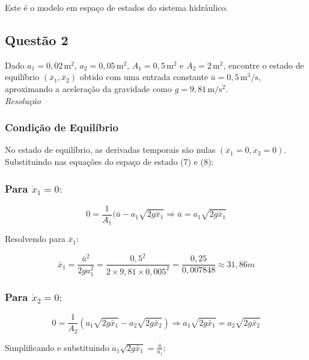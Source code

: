 \documentclass[12pt,a4]{article}
\begin{document}
Este é o modelo em espaço de estados  do sistema hidráulico.


    
\subsection{Questão 2}
    Dado $ a_1 = 0{,}02\,\text{m}^2 $, $a_2 = 0{,}05\,\text{m}^2 $, $ A_1 = 0{,}5\,\text{m}^2 $ e $ A_2 = 2\,\text{m}^2 $, encontre o estado de equilíbrio $ (\bar{x}_1, \bar{x}_2) $ obtido com uma entrada constante $ \bar{u} = 0{,}5\,\text{m}^3/\text{s} $, aproximando a aceleração da gravidade como $g = 9{,}81\,\text{m}/\text{s}^2 $.\\
    \textit{Resolução}
\subsubsection{Condição de Equilíbrio}
    No estado de equilíbrio, as derivadas temporais são nulas $(\dot{x}_1 = 0, \dot{x}_2 = 0)$. Substituindo nas equações do espaço de estado (7) e (8):

    \subsubsection{Para $\dot{x}_1 = 0:$}

     \begin{equation}
    0 = \frac{1}{A_1} (\bar{u} - a_1 \sqrt{2g \bar{x}_1} \Longrightarrow \bar{u} = a_1\sqrt{2g \bar{x}_1}
   \end{equation}

    Resolvendo para $\bar{x}_1:$

     \begin{equation}
    \bar{x}_1 = \frac{\bar{u}^2}{2ga_1^2} = \frac{0,5^2}{2 \times 9,81 \times 0,005^2} = \frac{0,25}{0,007848} \approx 31,86m
    \end{equation}

   \subsubsection{Para $\dot{x}_2 = 0:$}
    
     \begin{equation}
    0 = \frac{1}{A_2} (a_1 \sqrt{2g \bar{x}_1} - a_2 \sqrt{2g \bar{x}_2}) \Longrightarrow a_1\sqrt{2g \bar{x}_1} = a_2 \sqrt{2g \bar{x}_2}
    \end{equation}

    Simplificando e substituindo $a_1\sqrt{2g \bar{x}_1} = \frac{\bar{u}}{a_1}:$
\end{document}
